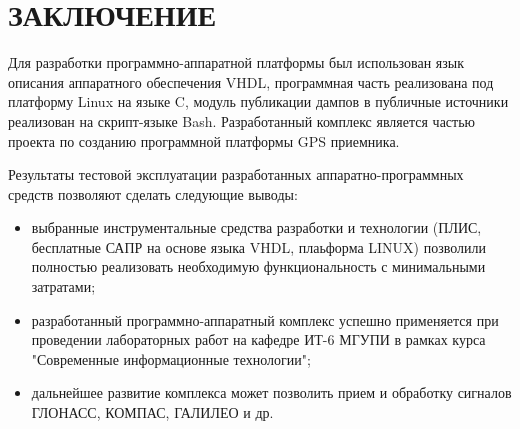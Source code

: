 \section*{ЗАКЛЮЧЕНИЕ}
Для разработки программно-аппаратной платформы был использован язык описания аппаратного обеспечения VHDL, программная часть реализована
под платформу Linux на языке C, модуль публикации дампов в публичные источники реализован на скрипт-языке Bash. Разработанный комплекс
является частью проекта по созданию программной платформы GPS приемника. 

Результаты тестовой эксплуатации разработанных аппаратно-программных средств позволяют сделать следующие выводы:
\begin{itemize}
\item выбранные инструментальные средства разработки и технологии  (ПЛИС, бесплатные САПР на основе языка VHDL, плаьформа LINUX) позволили
	полностью реализовать необходимую функциональность с минимальными затратами;
\item разработанный программно-аппаратный комплекс успешно применяется при проведении лабораторных работ на кафедре ИТ-6 МГУПИ в
	рамках курса "Современные информационные технологии";
\item дальнейшее развитие комплекса может позволить прием и обработку сигналов ГЛОНАСС, КОМПАС, ГАЛИЛЕО и др.
\end{itemize}


\newpage
